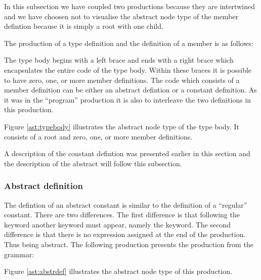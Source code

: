 In this subsection we have coupled two productions because they are intertwined and we have choosen not to visualise the abstract node type of the member defintion because it is simply a root with one child.

The production of a type definition and the definition of a member is as follows:

\begin{ebnf}
\end{ebnf}

The type body begins with a left brace and ends with a right brace which encapsulates the entire code of the type body. Within these braces it is possible to have zero, one, or more member definitions. The code which consists of a member definition can be either an abstract defintion or a constant definition. As it was in the ``program'' production it is also to interleave the two definitions in this production.



Figure \ref{ast:typebody} illustrates the abstract node type of the type body. It consists of a root and zero, one, or more member definitions.

A description of the constant defintion was presented earlier in this section and the description of the abstract will follow this subsection.

\subsubsection{Abstract definition}%
The defintion of an abstract constant is similar to the definition of a ``regular'' constant. There are two differences. The first difference is that following the  keyword another keyword must appear, namely the  keyword. The second difference is that there is no expression assigned at the end of the production. Thus being abstract. The following production presents the production from the grammar:

\begin{ebnf}%
\end{ebnf}%

Figure \ref{ast:abstrdef} illustrates the abstract node type of this production.

